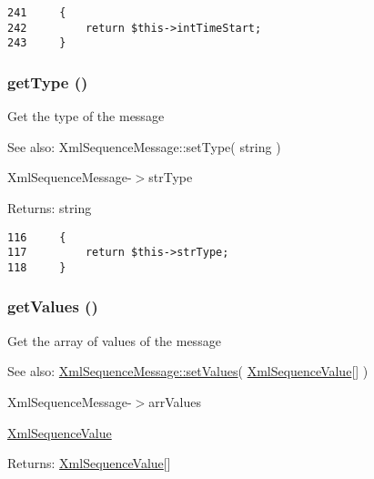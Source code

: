 \begin{Code}\begin{verbatim}241     {
242         return $this->intTimeStart;
243     }
\end{verbatim}
\end{Code}


\hypertarget{class_xml_sequence_message_830b5c75df72b32396701bc563fbe3c7}{
\subsubsection[{getType}]{\setlength{\rightskip}{0pt plus 5cm}getType ()}}
\label{class_xml_sequence_message_830b5c75df72b32396701bc563fbe3c7}


Get the type of the message

\begin{Desc}
\item[See also:]XmlSequenceMessage::setType( string ) 

XmlSequenceMessage-$>$strType \end{Desc}
\begin{Desc}
\item[Returns:]string \end{Desc}


\begin{Code}\begin{verbatim}116     {
117         return $this->strType;
118     }
\end{verbatim}
\end{Code}


\hypertarget{class_xml_sequence_message_70a0fe08035189260c72e32a9e20d30c}{
\subsubsection[{getValues}]{\setlength{\rightskip}{0pt plus 5cm}getValues ()}}
\label{class_xml_sequence_message_70a0fe08035189260c72e32a9e20d30c}


Get the array of values of the message

\begin{Desc}
\item[See also:]\hyperlink{class_xml_sequence_message_18c41e77a9f42da10d074cda0ea308fe}{XmlSequenceMessage::setValues}( \hyperlink{class_xml_sequence_value}{XmlSequenceValue}\mbox{[}\mbox{]} ) 

XmlSequenceMessage-$>$arrValues 

\hyperlink{class_xml_sequence_value}{XmlSequenceValue} \end{Desc}
\begin{Desc}
\item[Returns:]\hyperlink{class_xml_sequence_value}{XmlSequenceValue}\mbox{[}\mbox{]} \end{Desc}


